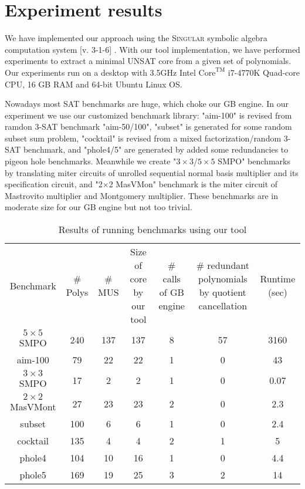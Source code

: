 \section{Experiment results}
We have implemented our approach using the \textsc{Singular} symbolic
algebra computation system [v. 3-1-6] \cite{DGPS}. With our
tool implementation, we have performed experiments to extract a minimal UNSAT core from a given set of
polynomials. Our experiments run on a desktop with
3.5GHz Intel $\text{Core}^\text{TM}$ i7-4770K Quad-core CPU, 16 GB RAM and
64-bit Ubuntu Linux OS.

Nowadays most SAT benchmarks are huge, which choke our GB engine. In our experiment we use our customized 
benchmark library: "aim-100" is revised from ramdon 3-SAT benchmark "aim-50/100", "subset" is generated for
some random subset sum problem, "cocktail" is revised from a mixed factorization/random 3-SAT benchmark,
and "phole4/5" are generated by added some redundancies to pigeon hole benchmarks. Meanwhile we create "$3\times3$/$5\times5$ SMPO" benchmarks
by translating miter circuits of unrolled sequential normal basis multiplier \cite{SMPO}
and its specification circuit, and "2$\times$2 MasVMon" benchmark is the miter circuit of Mastrovito multiplier and Montgomery 
multiplier. These benchmarks are in moderate size for our GB engine but not too trivial.

\vspace{-0.1in}
\begin{table}[htb]
\centering
\caption{\small Results of running benchmarks using our tool}
\begin{tabular}{|c||c|c|c|c|c|c|}
\hline
\multirow{4}{2cm}{Benchmark} 
& \multirow{4}{0.9cm}{\# Polys} 
& \multirow{4}{0.8cm}{\# MUS} 
& \multirow{4}{1.8cm}{Size of core by our tool}
 & \multirow{4}{1.6cm}{\# calls of GB engine}
 & \multirow{4}{2cm}{\# redundant polynomials by quotient cancellation}
 & \multirow{4}{1.3cm}{Runtime (sec)} \\
  & & & & & & \\
    & & & & & & \\
      & & & & & & \\
\hline
\hline
$5\times 5$ SMPO & 240  & 137  & 137  & 8  & 57 & 3160\\
\hline
aim-100 & 79 & 22 & 22 & 1  & 0 & 43\\
\hline
$3 \times 3$ SMPO & 17 & 2 & 2 & 1 & 0 & 0.07  \\
$2 \times 2$ MasVMont & 27 & 23 & 23 & 2 & 0 & 2.3 \\
subset & 100 & 6 & 6 & 1 & 0 & 2.4 \\
cocktail & 135 & 4 & 4 & 2 & 1 & 5 \\
phole4 & 104 & 10 & 16 & 1 & 0 & 4.4 \\
phole5 & 169 & 19 & 25 & 3 & 2 & 14 \\
\hline
\end{tabular}
\label{tab:result}  
\end{table} 

